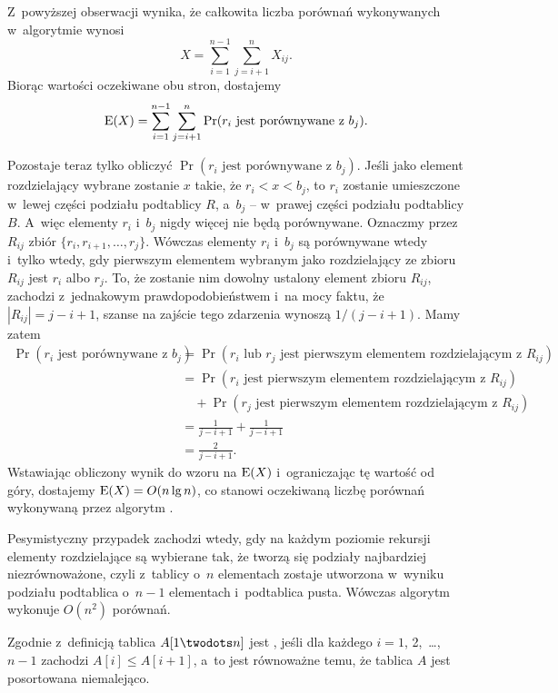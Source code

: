 Z~powyższej obserwacji wynika, że całkowita liczba porównań wykonywanych w~algorytmie wynosi
\[
    X = \sum_{i=1}^{n-1}\sum_{j=i+1}^nX_{ij}.
\]
Biorąc wartości oczekiwane obu stron, dostajemy
\[
    \operatorname{E}(X) = \sum_{i=1}^{n-1}\sum_{j=i+1}^n\Pr(\text{$r_i$ jest porównywane z~$b_j$}).
\]

Pozostaje teraz tylko obliczyć $\Pr(\text{$r_i$ jest porównywane z~$b_j$})$. Jeśli jako element rozdzielający wybrane zostanie $x$ takie, że $r_i<x<b_j$, to $r_i$ zostanie umieszczone w~lewej części podziału podtablicy $R$, a~$b_j$ -- w~prawej części podziału podtablicy $B$. A~więc elementy $r_i$ i~$b_j$ nigdy więcej nie będą porównywane. Oznaczmy przez $R_{ij}$ zbiór $\{r_i,r_{i+1},\dots,r_j\}$. Wówczas elementy $r_i$ i~$b_j$ są porównywane wtedy i~tylko wtedy, gdy pierwszym elementem wybranym jako rozdzielający ze zbioru $R_{ij}$ jest $r_i$ albo $r_j$. To, że zostanie nim dowolny ustalony element zbioru $R_{ij}$, zachodzi z~jednakowym prawdopodobieństwem i~na mocy faktu, że $|R_{ij}|=j-i+1$, szanse na zajście tego zdarzenia wynoszą $1/(j-i+1)$. Mamy zatem
\begin{align*}
    \Pr(\text{$r_i$ jest porównywane z~$b_j$}) &= \Pr(\text{$r_i$ lub $r_j$ jest pierwszym elementem rozdzielającym z~$R_{ij}$}) \\
	&= \Pr(\text{$r_i$ jest pierwszym elementem rozdzielającym z~$R_{ij}$}) \\
	&\quad {}+\Pr(\text{$r_j$ jest pierwszym elementem rozdzielającym z~$R_{ij}$}) \\
	&= \frac{1}{j-i+1}+\frac{1}{j-i+1} \\
	&= \frac{2}{j-i+1}.
\end{align*}
Wstawiając obliczony wynik do wzoru na $\operatorname{E}(X)$ i~ograniczając tę wartość od góry, dostajemy $\operatorname{E}(X)=O(n\lg n)$, co stanowi oczekiwaną liczbę porównań wykonywaną przez algorytm .

Pesymistyczny przypadek zachodzi wtedy, gdy na każdym poziomie rekursji elementy rozdzielające są wybierane tak, że tworzą się podziały najbardziej niezrównoważone, czyli z~tablicy o~$n$ elementach zostaje utworzona w~wyniku podziału podtablica o~$n-1$ elementach i~podtablica pusta. Wówczas algorytm wykonuje $O(n^2)$ porównań.


\subproblem %
Zgodnie z~definicją tablica $A[1\twodots n]$ jest , jeśli dla każdego $i=1$, 2,~\dots,~$n-1$ zachodzi $A[i]\le A[i+1]$, a~to jest równoważne temu, że tablica $A$ jest posortowana niemalejąco.

